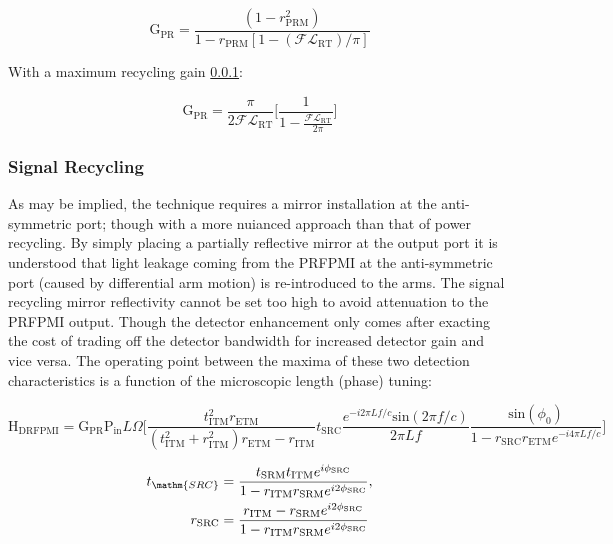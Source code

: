 {\begin{equation}
	\mathrm{G_{PR}} = \frac{(1-r_\mathrm{PRM}^2)}{1-r_\mathrm{PRM}[1- (\mathscr{F} \mathscr{L}_\mathrm{RT})/ \pi]}
\end{equation}

With a maximum recycling gain \ref{}: 

\begin{equation}
	\mathrm{G_{PR}} = \frac{\pi}{2 \mathscr{F} \mathscr{L}_\mathrm{RT}} \bigg[ \frac{1}{1- \frac{ \mathscr{F} \mathscr{L}_\mathrm{RT}}{ 2 \pi}} \bigg]
\end{equation}

\subsubsection{Signal Recycling}
As may be implied, the technique requires a mirror installation at the anti-symmetric port; though with a more nuianced approach than that of power recycling. By simply placing a partially reflective mirror at the output port it is understood that light leakage coming from the PRFPMI at the anti-symmetric port (caused by differential arm motion) is re-introduced to the arms. The signal recycling mirror reflectivity cannot be set too high to avoid attenuation to the PRFPMI output. Though the detector enhancement only comes after exacting the cost of trading off the detector bandwidth for increased detector gain and vice versa. The operating point between the maxima of these two detection characteristics is a function of the microscopic length (phase) tuning:

\begin{equation}
	\mathrm{H}_\mathrm{DRFPMI} = \mathrm{G}_\mathrm{PR} \mathrm{P}_\mathrm{in} L \Omega \bigg[ \frac{ t_\mathrm{ITM}^2 r_\mathrm{ETM}}{(t_\mathrm{ITM}^2 + r_\mathrm{ITM}^2)r_\mathrm{ETM} - r_\mathrm{ITM}}  t_\mathrm{SRC} \frac{e^{-i 2 \pi L f / c} \mathrm{sin}( 2 \pi f / c)}{ 2 \pi L f } \frac{\mathrm{sin}(\phi_0)}{1- r_\mathrm{SRC}r_\mathrm{ETM} e^{-i 4 \pi L f / c}} \bigg]
\end{equation}

\begin{equation}
\begin{align}
	t_\mathm{SRC} & = \frac{t_\mathrm{SRM} t_\mathrm{ITM} e^{i\phi_\mathrm{SRC}}}{1-r_\mathrm{ITM} r_\mathrm{SRM} e^{i2\phi_\mathrm{SRC}}}, \\
	r_\mathrm{SRC} & = \frac{r_\mathrm{ITM} - r_\mathrm{SRM} e^{i2\phi_\mathrm{SRC}}}{1-r_\mathrm{ITM} r_\mathrm{SRM} e^{i2\phi_\mathrm{SRC}}} \\
\end{align}
\end{equation}

}
